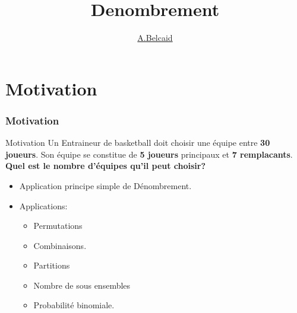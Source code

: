 \documentclass{beamer}
\title{Denombrement}
\author{\underline{A.Belcaid}}
\institute{\small ENSA-Safi}
\begin{document}
\maketitle

\begin{frame}
\tableofcontents
\end{frame}
\section{Motivation}
\begin{frame}[t]
  \frametitle{Motivation}
  
  \begin{block}{Motivation}
    \scriptsize
    Un Entraineur de basketball doit choisir une équipe entre \textbf{30
    joueurs}. Son équipe se constitue de \textbf{5 joueurs} principaux et
    \textbf{7 remplacants}.\\[4pt] 
    \alert{\textbf{Quel est le nombre d'équipes qu'il peut choisir?}} 
  \end{block}
  \pause
\begin{itemize}
    \item Application principe simple de Dénombrement.\\[4pt]
    \item Applications:
      \pause
      \begin{multicols}{2}
       \begin{itemize}
       \item Permutations
        \item Combinaisons.
        \item Partitions
        \item Nombre de sous ensembles
        \item Probabilité binomiale.
      \end{itemize}
        
      \end{multicols}
  \end{itemize}

\end{frame}
\end{document}
